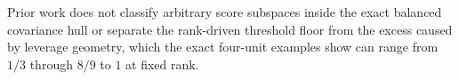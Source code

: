 Prior work does not classify arbitrary score subspaces inside the exact balanced covariance hull or separate the rank-driven threshold floor from the excess caused by leverage geometry, which the exact four-unit examples show can range from \(1/3\) through \(8/9\) to \(1\) at fixed rank.